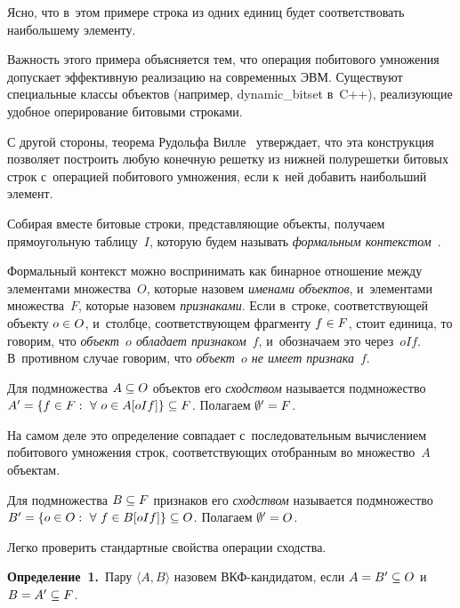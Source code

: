 \begin{multicols}{2}
    Ясно, что в~этом примере строка из одних единиц будет соответствовать 
наибольшему элементу.
    
    Важность этого примера объясняется тем, что операция побитового 
умножения допускает эффективную реализацию на современных ЭВМ. 
Существуют специальные классы объектов (например, {dynamic\_bitset} 
в~C++), реализующие удобное оперирование битовыми строками.
    
    С другой стороны, теорема Рудольфа Вилле~\cite{2-vin} утверждает, что 
эта конструкция позволяет построить любую конечную решетку из нижней 
полурешетки битовых строк с~операцией побитового умножения, если к~ней 
добавить наибольший элемент.
    
    Собирая вместе битовые строки, представляющие объекты, получаем 
прямоугольную таблицу~$I$, которую будем называть \textit{формальным 
контекстом}~\cite{2-vin}. 

Формальный контекст можно воспринимать как 
бинарное отношение между элементами множества~$O$, которые назовем 
\textit{именами объектов}, и~элементами множества~$F$, которые назовем 
\textit{признаками}. Если в~строке, соответствующей объекту $o\hm\in O$, 
и~столбце, соответствующем фрагменту $f\hm\in F$, стоит единица, то 
говорим, что \textit{объект~$o$ обладает признаком}~$f$, и~обозначаем это 
через~$oIf$. В~противном случае говорим, что \textit{объект~$o$ не имеет 
признака}~$f$.
    
    Для подмножества $A\hm\subseteq O$ объектов его \textit{сходством} 
называется подмножество $A^\prime\hm= \{f \in F:\ \forall\ o\in 
A[oIf]\}\hm\subseteq F$. Полагаем $\emptyset^\prime\hm=F$.
    
    На самом деле это определение совпадает с~последовательным 
вычислением побитового умножения строк, соответствующих отобранным 
во множество~$A$ объектам. 
    
    Для подмножества $B\hm\subseteq F$ признаков его \textit{сходством} 
называется подмножество $B^\prime\hm= \{o\in O:\ \forall\ f\hm\in B[oIf]\} 
\hm\subseteq O$. Полагаем $\emptyset^\prime\hm=O$.
    
    Легко проверить стандартные свойства операции сходства.
    
    \smallskip
    
    \noindent
    \textbf{Определение~1.}\ Пару $\langle A, B\rangle$  назовем 
    ВКФ-кан\-ди\-да\-том, если $A\hm= B^\prime \hm\subseteq O$ 
и~$B\hm= A^\prime \hm\subseteq F$.
    
    \smallskip
    

\end{multicols}
